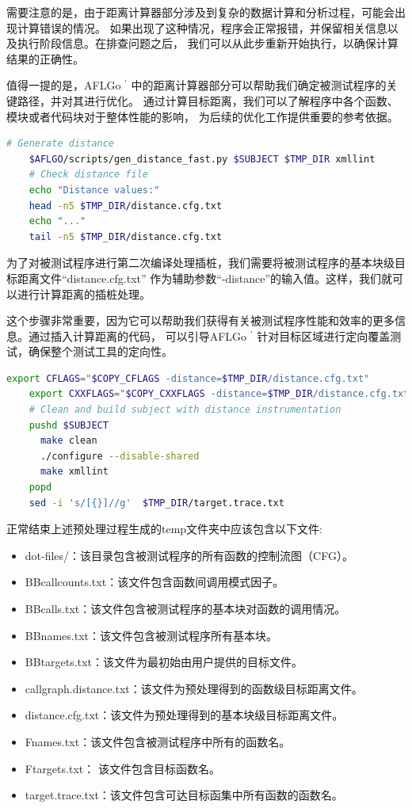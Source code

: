 \documentclass[bachelor]{njupthesis}
\begin{document}
需要注意的是，由于距离计算器部分涉及到复杂的数据计算和分析过程，可能会出现计算错误的情况。
如果出现了这种情况，程序会正常报错，并保留相关信息以及执行阶段信息。在排查问题之后，
我们可以从此步重新开始执行，以确保计算结果的正确性。

值得一提的是，AFLGo $^\prime$ 中的距离计算器部分可以帮助我们确定被测试程序的关键路径，并对其进行优化。
通过计算目标距离，我们可以了解程序中各个函数、模块或者代码块对于整体性能的影响，
为后续的优化工作提供重要的参考依据。
\begin{lstlisting}[language=bash]
	# Generate distance
	$AFLGO/scripts/gen_distance_fast.py $SUBJECT $TMP_DIR xmllint
	# Check distance file
	echo "Distance values:"
	head -n5 $TMP_DIR/distance.cfg.txt
	echo "..."
	tail -n5 $TMP_DIR/distance.cfg.txt
\end{lstlisting}

为了对被测试程序进行第二次编译处理插桩，我们需要将被测试程序的基本块级目标距离文件“distance.cfg.txt”
作为辅助参数“-distance”的输入值。这样，我们就可以进行计算距离的插桩处理。

这个步骤非常重要，因为它可以帮助我们获得有关被测试程序性能和效率的更多信息。通过插入计算距离的代码，
可以引导AFLGo $^\prime$ 针对目标区域进行定向覆盖测试，确保整个测试工具的定向性。

\begin{lstlisting}[language=bash]
	export CFLAGS="$COPY_CFLAGS -distance=$TMP_DIR/distance.cfg.txt"
	export CXXFLAGS="$COPY_CXXFLAGS -distance=$TMP_DIR/distance.cfg.txt"
	# Clean and build subject with distance instrumentation
	pushd $SUBJECT
	  make clean
	  ./configure --disable-shared
	  make xmllint
	popd
	sed -i 's/[{}]//g'  $TMP_DIR/target.trace.txt
\end{lstlisting}

正常结束上述预处理过程生成的temp文件夹中应该包含以下文件:
\begin{itemize}[leftmargin=36pt]
	\item dot-files/：该目录包含被测试程序的所有函数的控制流图（CFG）。
	\item BBcallcounts.txt：该文件包含函数间调用模式因子。
	\item BBcalls.txt：该文件包含被测试程序的基本块对函数的调用情况。
	\item BBnames.txt：该文件包含被测试程序所有基本块。
	\item BBtargets.txt：该文件为最初始由用户提供的目标文件。
	\item callgraph.distance.txt：该文件为预处理得到的函数级目标距离文件。
	\item distance.cfg.txt：该文件为预处理得到的基本块级目标距离文件。
	\item Fnames.txt：该文件包含被测试程序中所有的函数名。
	\item Ftargets.txt： 该文件包含目标函数名。
	\item target.trace.txt：该文件包含可达目标函集中所有函数的函数名。
\end{itemize}
\end{document}
